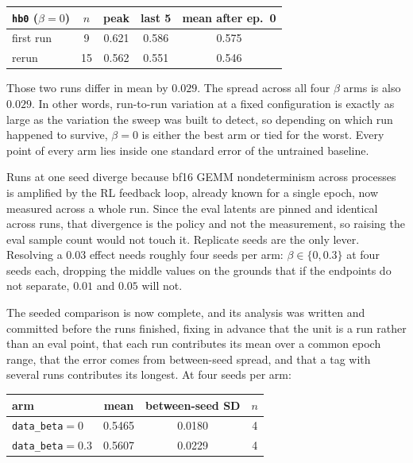 \documentclass[11pt]{article}
\newcommand{\code}[1]{\texttt{\small #1}}
\begin{document}
\begin{center}
\begin{tabular}{lcccc}
\toprule
\code{hb0} ($\beta{=}0$) & $n$ & peak & last 5 & mean after ep.\ 0 \\
\midrule
first run & 9 & 0.621 & 0.586 & 0.575 \\
rerun & 15 & 0.562 & 0.551 & 0.546 \\
\bottomrule
\end{tabular}
\end{center}

\noindent Those two runs differ in mean by $0.029$. The spread across all four $\beta$ arms is also $0.029$. In other words, run-to-run variation at a fixed configuration is exactly as large as the variation the sweep was built to detect, so depending on which run happened to survive, $\beta{=}0$ is either the best arm or tied for the worst. Every point of every arm lies inside one standard error of the untrained baseline.

Runs at one seed diverge because bf16 GEMM nondeterminism across processes is amplified by the RL feedback loop, already known for a single epoch, now measured across a whole run. Since the eval latents are pinned and identical across runs, that divergence is the policy and not the measurement, so raising the eval sample count would not touch it. Replicate seeds are the only lever. Resolving a $0.03$ effect needs roughly four seeds per arm: $\beta \in \{0, 0.3\}$ at four seeds each, dropping the middle values on the grounds that if the endpoints do not separate, $0.01$ and $0.05$ will not.

The seeded comparison is now complete, and its analysis was written and committed before the runs finished, fixing in advance that the unit is a run rather than an eval point, that each run contributes its mean over a common epoch range, that the error comes from between-seed spread, and that a tag with several runs contributes its longest. At four seeds per arm:

\begin{center}
\begin{tabular}{lccc}
\toprule
arm & mean & between-seed SD & $n$ \\
\midrule
\code{data\_beta}$=0$ & 0.5465 & 0.0180 & 4 \\
\code{data\_beta}$=0.3$ & 0.5607 & 0.0229 & 4 \\
\bottomrule
\end{tabular}
\end{center}
\end{document}

